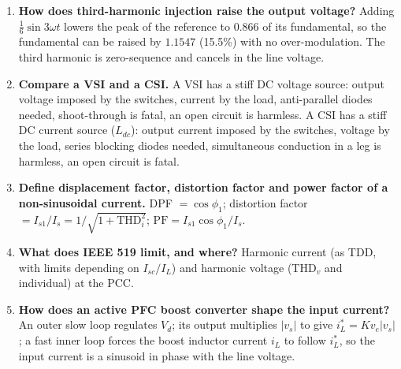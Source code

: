 \documentclass[11pt,a4paper]{article}
\begin{document}
\begin{enumerate}[leftmargin=*]
  \item \textbf{How does third-harmonic injection raise the output voltage?} Adding $\frac{1}{6}\sin 3\omega t$ lowers the peak of the reference to $0.866$ of its fundamental, so the fundamental can be raised by $1.1547$ (15.5\%) with no over-modulation. The third harmonic is zero-sequence and cancels in the line voltage.
  \item \textbf{Compare a VSI and a CSI.} A VSI has a stiff DC voltage source: output voltage imposed by the switches, current by the load, anti-parallel diodes needed, shoot-through is fatal, an open circuit is harmless. A CSI has a stiff DC current source ($L_{dc}$): output current imposed by the switches, voltage by the load, series blocking diodes needed, simultaneous conduction in a leg is harmless, an open circuit is fatal.
  \item \textbf{Define displacement factor, distortion factor and power factor of a non-sinusoidal current.} DPF $= \cos\phi_1$; distortion factor $= I_{s1}/I_s = 1/\sqrt{1 + \text{THD}_i^2}$; $\text{PF} = I_{s1}\cos\phi_1/I_s$.
  \item \textbf{What does IEEE 519 limit, and where?} Harmonic current (as TDD, with limits depending on $I_{sc}/I_L$) and harmonic voltage (THD$_v$ and individual) at the PCC.
  \item \textbf{How does an active PFC boost converter shape the input current?} An outer slow loop regulates $V_d$; its output multiplies $|v_s|$ to give $i_L^* = Kv_e|v_s|$; a fast inner loop forces the boost inductor current $i_L$ to follow $i_L^*$, so the input current is a sinusoid in phase with the line voltage.
\end{enumerate}
\end{document}
